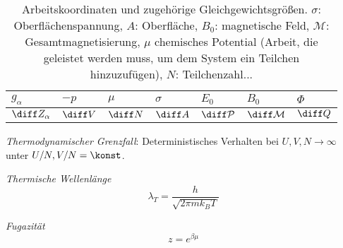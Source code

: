 \documentclass[11pt]{article}
\numberwithin{equation}{section}
\begin{document}
        \begin{table}[h]
          \begin{center}
          \begin{tabular}{ l | l l l l l l }
            $g_\alpha$ & $-p$ & $\mu$ & $\sigma$ & $E_0$ & $B_0$ & $\Phi$ \\ \hline
            $\diff Z_\alpha$ & $\diff V$ & $\diff N$ & $\diff A$ & $\diff \mathcal{P}$ & $\diff \mathcal{M}$ & $\diff Q$ \\
            \end{tabular}
          \caption{Arbeitskoordinaten und zugehörige Gleichgewichtsgrößen. $\sigma$: Oberflächenspannung, $A$: Oberfläche, $B_0$: magnetische Feld, $\mathcal{M}$: Gesamtmagnetisierung, $\mu$ chemisches Potential (Arbeit, die geleistet werden muss, um dem System ein Teilchen hinzuzufügen), $N$: Teilchenzahl...}
          \label{tab:ArbeitskoordinatenUndGleichgewichtsgroessen}
          \end{center}
        \end{table} \vsp

        \emph{Thermodynamischer Grenzfall}: \newline Deterministisches Verhalten bei $U,V,N\rightarrow\infty$ unter $U/N,V/N=\konst$. \vsp


        \emph{Thermische Wellenlänge}
        \begin{equation}
          \lambda_T = \frac{h}{\sqrt{2\pi m k_B T}}
        \end{equation} \vsp

        \emph{Fugazität}
        \begin{equation}
          z = e^{\beta\mu}
        \end{equation} \vsp
\end{document}
